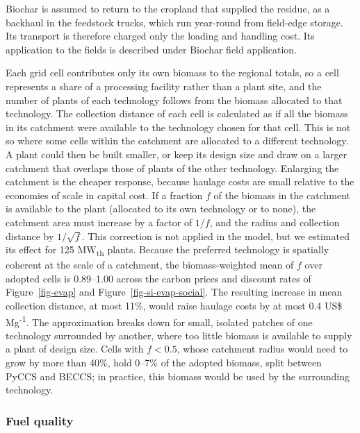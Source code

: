 \documentclass[
  letterpaper,
  twoside,
  twocolumn,
  9pt]{article}
\begin{document}
Biochar is assumed to return to the cropland that supplied the residue,
as a backhaul in the feedstock trucks, which run year-round from
field-edge storage. Its transport is therefore charged only the loading
and handling cost. Its application to the fields is described under
Biochar field application.

Each grid cell contributes only its own biomass to the regional totals,
so a cell represents a share of a processing facility rather than a
plant site, and the number of plants of each technology follows from the
biomass allocated to that technology. The collection distance of each
cell is calculated as if all the biomass in its catchment were available
to the technology chosen for that cell. This is not so where some cells
within the catchment are allocated to a different technology. A plant
could then be built smaller, or keep its design size and draw on a
larger catchment that overlaps those of plants of the other technology.
Enlarging the catchment is the cheaper response, because haulage costs
are small relative to the economies of scale in capital cost. If a
fraction \(f\) of the biomass in the catchment is available to the plant
(allocated to its own technology or to none), the catchment area must
increase by a factor of \(1/f\), and the radius and collection distance
by \(1/\sqrt{f}\). This correction is not applied in the model, but we
estimated its effect for 125 MW\textsubscript{th} plants. Because the
preferred technology is spatially coherent at the scale of a catchment,
the biomass-weighted mean of \(f\) over adopted cells is 0.89--1.00
across the carbon prices and discount rates of Figure~\ref{fig-evap} and
Figure~\ref{fig-si-evap-social}. The resulting increase in mean
collection distance, at most 11\%, would raise haulage costs by at most
0.4 US\$ Mg\textsuperscript{-1}. The approximation breaks down for
small, isolated patches of one technology surrounded by another, where
too little biomass is available to supply a plant of design size. Cells
with \(f < 0.5\), whose catchment radius would need to grow by more than
40\%, hold 0--7\% of the adopted biomass, split between PyCCS and BECCS;
in practice, this biomass would be used by the surrounding technology.

\subsubsection{Fuel quality}\label{fuel-quality}
\end{document}
